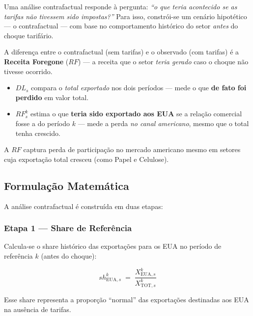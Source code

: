 \documentclass[12pt, a4paper]{article}
\begin{document}
Uma análise contrafactual responde à pergunta:
\emph{``o que teria acontecido se as tarifas não tivessem sido impostas?''}
Para isso, constrói-se um cenário hipotético --- o contrafactual ---
com base no comportamento histórico do setor \emph{antes} do choque tarifário.

A diferença entre o contrafactual (sem tarifas) e o observado (com tarifas)
é a \textbf{Receita Foregone} ($RF$) --- a receita que o setor
\emph{teria gerado} caso o choque não tivesse ocorrido.

\begin{interpretabox}
\begin{itemize}[noitemsep]
  \item $DL_s$ compara o \emph{total exportado} nos dois períodos ---
    mede o que \textbf{de fato foi perdido} em valor total.
  \item $RF_s^k$ estima o que \textbf{teria sido exportado aos EUA}
    se a relação comercial fosse a do período $k$ ---
    mede a perda \emph{no canal americano}, mesmo que o total
    tenha crescido.
\end{itemize}
A $RF$ captura perda de participação no mercado americano mesmo em setores
cuja exportação total cresceu (como Papel e Celulose).
\end{interpretabox}

\subsection{Formulação Matemática}

A análise contrafactual é construída em duas etapas:

\subsubsection*{Etapa 1 --- Share de Referência}

Calcula-se o share histórico das exportações para os EUA no
período de referência $k$ (antes do choque):

\begin{formulabox}
\begin{equation}
  sh_{\text{EUA},s}^{k}
    \;=\; \frac{X_{\text{EUA},s}^{k}}{X_{\text{TOT},s}^{k}}
  \label{eq:share}
\end{equation}
\end{formulabox}

Esse share representa a proporção ``normal'' das exportações destinadas
aos EUA na ausência de tarifas.
\end{document}
